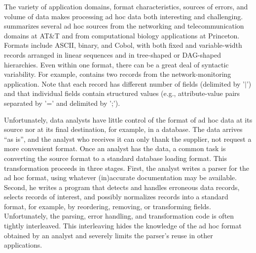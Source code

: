 The variety of application domains, format characteristics, sources of
errors, and volume of data makes processing ad hoc data both
interesting and challenging.   summarizes
several ad hoc sources from the networking and telecommunication
domains at AT\&T and from computational biology applications at
Princeton.  Formats include ASCII, binary, and Cobol, with both fixed
and variable-width records arranged in linear sequences and in
tree-shaped or DAG-shaped hierarchies.  Even within one format, there
can be a great deal of syntactic variability.  For example,
 contains two records from the
network-monitoring application.  Note that each record has different
number of fields (delimited by '$|$') and that individual fields contain
structured values (e.g., attribute-value pairs separated by '=' and
delimited by ';').

Unfortunately, data analysts have little control of the format of
ad hoc data at its source nor at its final destination, for
example, in a database.  The data arrives ``as is'', and the analyst
who receives it can only thank the supplier, not request a more
convenient format.  Once an analyst has the data, a common task is
converting the source format to a standard database loading format.
This transformation proceeds in three stages.  First, the analyst
writes a parser for the ad hoc format, using whatever (in)accurate
documentation may be available.  Second, he writes a program that 
detects and handles erroneous data records, selects records
of interest, and possibly normalizes records into a standard format,
for example, by reordering, removing, or transforming fields.
Unfortunately, the parsing, error handling, and transformation code is
often tightly interleaved.  This interleaving hides the knowledge of
the ad hoc format obtained by an analyst and severely limits the
parser's reuse in other applications.

